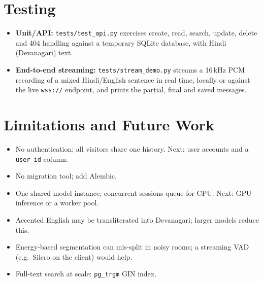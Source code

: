 \documentclass[11pt,a4paper]{article}
\begin{document}
\section{Testing}
\begin{itemize}[leftmargin=*]
  \item \textbf{Unit/API:} \texttt{tests/test\_api.py} exercises create, read, search, update, delete and 404 handling
        against a temporary SQLite database, with Hindi (Devanagari) text.
  \item \textbf{End-to-end streaming:} \texttt{tests/stream\_demo.py} streams a 16\,kHz PCM recording of a mixed
        Hindi/English sentence in real time, locally or against the live \texttt{wss://} endpoint, and prints
        the partial, final and saved messages.
\end{itemize}

\section{Limitations and Future Work}
\begin{itemize}[leftmargin=*]
  \item No authentication; all visitors share one history. Next: user accounts and a \texttt{user\_id} column.
  \item No migration tool; add Alembic.
  \item One shared model instance; concurrent sessions queue for CPU. Next: GPU inference or a worker pool.
  \item Accented English may be transliterated into Devanagari; larger models reduce this.
  \item Energy-based segmentation can mis-split in noisy rooms; a streaming VAD (e.g.\ Silero on the client) would help.
  \item Full-text search at scale: \texttt{pg\_trgm} GIN index.
\end{itemize}
\end{document}
